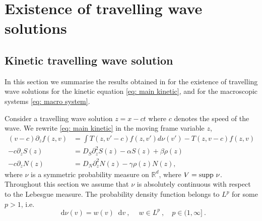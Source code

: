 \documentclass[11pt,twoside]{article}
\newcommand*\diff{\mathop{}\!\mathrm{d}}
\begin{document}



\section{Existence of travelling wave solutions}


\subsection{Kinetic travelling wave solution}
In this section we summarise the results obtained in \cite{calvez2016chemotactic} for the existence of travelling wave solutions for the kinetic equation \eqref{eq: main kinetic},  and for the macroscopic systems \eqref{eq: macro system}.

Consider a travelling wave solution $z=x-ct$ where $c$ denotes the speed of the wave. We rewrite \eqref{eq: main kinetic} in the moving frame variable $z$,
\begin{equation}
\begin{aligned}\label{system}
(v-c)\partial_zf(z,v)&=\int T(z,v'-c)f(z,v')d\nu(v')-T(z,v-c)f(z,v)\\
-c\partial_z S(z)&=D_S\partial_{z}^2S(z)-\alpha S(z)+\beta \rho(z)\\
-c\partial_zN(z)&=D_N\partial_{z}^2N(z)-\gamma\rho(z) N(z)
,
\end{aligned}
\end{equation}
where $\nu$ is a symmetric probability measure on $\mathbb{R}^d$, where $V=\textnormal{supp}\ \nu$. Throughout this section we assume that $\nu$ is absolutely continuous with respect to the Lebesgue measure. The probability density function belongs to $L^p$ for some $p > 1$, i.e.
\[
\diff \nu (v)=w(v)\diff v\ ,\ \quad w\in L^p\ , \quad p\in(1,\infty]\ .
\]
\end{document}
